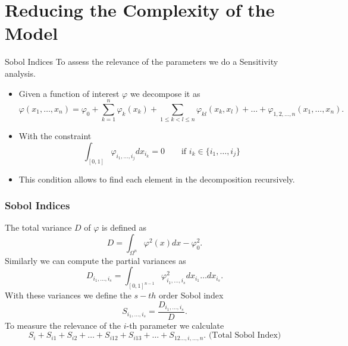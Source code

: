 \documentclass[11pt]{beamer}
\theoremstyle{plain}
\theoremstyle{definition}
\newcommand\ChangeFont{\fontsize{9}{7.2}\selectfont}
\begin{document}
\section{Reducing the Complexity of the Model}

\begin{frame}{Sobol Indices}
\ChangeFont
To assess the relevance of the parameters we do a Sensitivity analysis.
\begin{itemize}
\item Given a function of interest $\varphi$ we decompose it as 
\begin{equation*}
\varphi(x_{1},\ldots,x_{n})=\varphi_{0}+\sum_{k=1}^{n}\varphi_{k}(x_{k})+
\sum_{1\leq k< l\leq n}\varphi_{kl}(x_{k},x_{l})+\ldots+
\varphi_{1,2,\ldots,n}(x_{1},\ldots,x_{n}).
\end{equation*}
\item With the constraint
\begin{equation}\label{eqnSobolCond1}
\int_{[0,1]}\varphi_{i_{1},\ldots,i_{j}}dx_{i_{k}}=0\qquad\text{if }  i_{k}\in \{i_{1},\ldots,i_{j}\}
\end{equation}
\item This condition allows to find each element in the decomposition recursively.
\end{itemize}
\end{frame}

\begin{frame}
\frametitle{Sobol Indices}
The total variance $D$ of $\varphi$ is defined as
\ChangeFont
\begin{equation*}
D=\int_{\Omega^{n}}\varphi^{2}(x)dx-\varphi_{0}^{2}.
\end{equation*}
Similarly we can compute the partial variances as
\begin{equation*}
D_{i_{1},\ldots,i_{s}}=\int_{[0,1]^{n-1}}\varphi^{2}_{i_{1},\ldots,i_{s}}dx_{i_{1}}\ldots dx_{i_{s}}.
\end{equation*}
With these variances we define the $s-th$ order  Sobol index
\begin{equation*} 
S_{i_{1},\ldots,i_{s}}=\frac{D_{i_{1},\ldots,i_{s}}}{D}.
\end{equation*}
To measure the relevance of the $i$-th parameter we calculate
\begin{equation*}
S_{i}+S_{i1}+S_{i2}+\ldots+S_{i12}+S_{i13}+\ldots+S_{12\ldots,i,\ldots, n}.
\text{ (Total Sobol Index)}
\end{equation*}
\end{frame}
\end{document}

